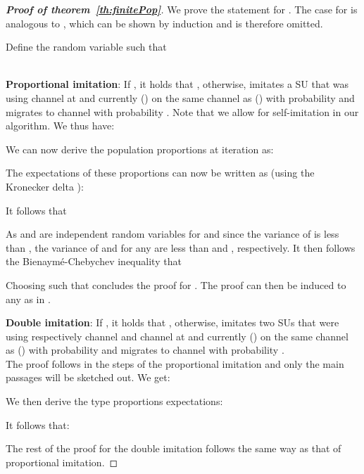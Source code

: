 \documentclass[12pt, onecolumn]{IEEEtran}
\theoremstyle{plain}
\theoremstyle{definition}
\begin{document}
\begin{proof}[\textbf{Proof of theorem~\ref{th:finitePop}}]

We prove the statement for . The case for  is analogous to \cite{Schlag96}, which can be shown by induction and is therefore omitted.



Define the random variable  such that

\\
{\bf Proportional imitation}: If , it holds that , otherwise,  imitates a SU that was using channel  at  and currently () on the same channel as  () with probability
 and migrates to channel  with probability . Note that we allow for self-imitation in our algorithm.
We thus have:



We can now derive the population proportions at iteration  as:

The expectations of these proportions can now be written as (using the Kronecker delta ):



It follows that





As  and  are independent random variables for  and since the variance of  is less than , the variance of  and  for any  are less than  and , respectively. It then follows the Bienaym\'e-Chebychev inequality that



Choosing  such that  concludes the proof for .
The proof can then be induced to any  as in \cite{Schlag96}.

{\bf Double imitation}: If , it holds that , otherwise,  imitates two SUs that were using respectively channel  and channel  at  and currently () on the same channel as  () with
probability  and migrates to channel  with probability .\\
The proof follows in the steps of the proportional imitation and only the main passages will be sketched out. We get:


We then derive the type proportions expectations:


It follows that:

The rest of the proof for the double imitation follows the same way as that of proportional imitation.
\end{proof}
\end{document}
